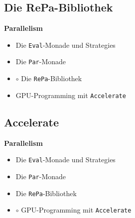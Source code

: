 \documentclass{beamer}
\begin{document}
\subsection{Die RePa-Bibliothek}

\begin{frame}[fragile]

\begin{center}
\Large
\textbf{Parallelism}\normalsize\bigskip
\begin{itemize}
\item Die \texttt{Eval}-Monade und Strategies
\item Die \texttt{Par}-Monade
\item $\circ$ Die \texttt{RePa}-Bibliothek
\item GPU-Programming mit \texttt{Accelerate}
\end{itemize}
\end{center}

\end{frame}


\subsection{Accelerate}

\begin{frame}[fragile]

\begin{center}
\Large
\textbf{Parallelism}\normalsize\bigskip
\begin{itemize}
\item Die \texttt{Eval}-Monade und Strategies
\item Die \texttt{Par}-Monade
\item Die \texttt{RePa}-Bibliothek
\item $\circ$ GPU-Programming mit \texttt{Accelerate}
\end{itemize}
\end{center}

\end{frame}

\end{document}
